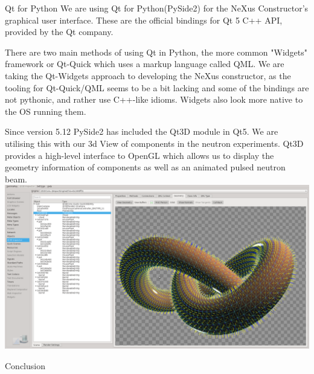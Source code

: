 \documentclass[usenames,dvipsnames]{beamer}
\begin{document}
\begin{frame}[t]
\begin{columns}[t]
\begin{column}{0.47\paperwidth}
\begin{custombox}{Qt for Python}
We are using Qt for Python(PySide2) for the NeXus Constructor's graphical user interface. These are the official bindings for Qt 5 C++ API, provided by the Qt company. 

There are two main methods of using Qt in Python, the more common "Widgets" framework or Qt-Quick which uses a markup language called QML.
We are taking the Qt-Widgets approach to developing the NeXus constructor, as the tooling for Qt-Quick/QML seems to be a bit lacking and some of the bindings are not pythonic, and rather use C++-like idioms. Widgets also look more native to the OS running them.

Since version 5.12 PySide2 has included the Qt3D module in Qt5. We are utilising this with our 3d View of components in the neutron experiments. Qt3D provides a high-level interface to OpenGL which allows us to display the geometry information of components as well as an animated pulsed neutron beam.
\includegraphics[width=\linewidth]{qt3d.png}
\end{custombox}

\begin{custombox}{Conclusion}
\lipsum[2]
\end{custombox}

\end{column}
\end{columns}
\end{frame}
\end{document}
